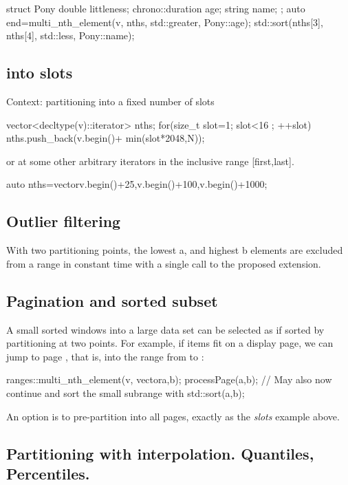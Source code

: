 \begin{codeblock}
struct Pony{
  double littleness; 
  chrono::duration age;
  string name;
};
auto end=multi_nth_element(v, nths, std::greater{}, Pony::age);
std::sort(nths[3], nths[4], std::less{}, Pony::name);
\end{codeblock}

\subsection{ into slots}
Context: partitioning into a fixed number of slots
\begin{codeblock}
vector<decltype(v)::iterator> nths;
for(size_t slot=1; slot<16 ; ++slot){
	nths.push_back(v.begin()+ min(slot*2048,N));
}
\end{codeblock}
or at some other arbitrary iterators in the inclusive range [first,last].
\begin{codeblock}
auto nths=vector{v.begin()+25,v.begin()+100,v.begin()+1000}; 
\end{codeblock}

\subsection{Outlier filtering}

With two partitioning points, the lowest a, and highest b elements are excluded from a range in constant time with a single call to the proposed extension.

\subsection{Pagination and sorted subset}

A small sorted windows into a large data set can be selected as if sorted by partitioning at two points. For example, if  items fit on a display page, we can jump to page , that is, into the range from  to :

\begin{codeblock}
ranges::multi_nth_element(v, vector{a,b});
processPage(a,b); // May also now continue and sort the small subrange with std::sort(a,b);
\end{codeblock}

An option is to pre-partition into all pages, exactly as the \emph{slots} example above.

\subsection{Partitioning with interpolation. Quantiles, Percentiles.}

